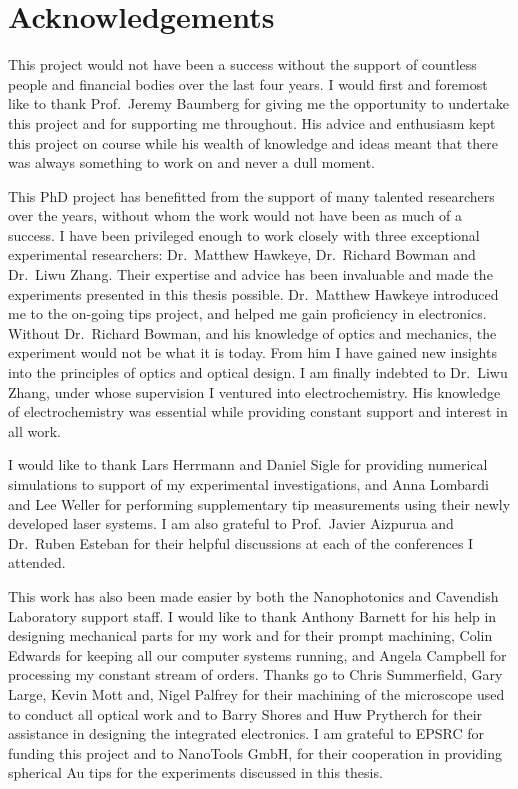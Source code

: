 \documentclass[12pt, a4paper, oneside]{book}
\begin{document}
\newpage
\section*{Acknowledgements}

This project would not have been a success without the support of countless people and financial bodies over the last four years.
I would first and foremost like to thank Prof.\ Jeremy Baumberg for giving me the opportunity to undertake this project and for supporting me throughout. His advice and enthusiasm kept this project on course while his wealth of knowledge and ideas meant that there was always something to work on and never a dull moment.

This PhD project has benefitted from the support of many talented researchers over the years, without whom the work would not have been as much of a success. I have been privileged enough to work closely with three exceptional experimental researchers: Dr.\ Matthew Hawkeye, Dr.\ Richard Bowman and Dr.\ Liwu Zhang. Their expertise and advice has been invaluable and made the experiments presented in this thesis possible. Dr.\ Matthew Hawkeye introduced me to the on-going tips project, and helped me gain proficiency in electronics. Without Dr.\ Richard Bowman, and his knowledge of optics and mechanics, the experiment would not be what it is today. From him I have gained new insights into the principles of optics and optical design. I am finally indebted to Dr.\ Liwu Zhang, under whose supervision I ventured into electrochemistry. His knowledge of electrochemistry was essential while providing constant support and interest in all work.

I would like to thank Lars Herrmann and Daniel Sigle for providing numerical simulations to support of my experimental investigations, and Anna Lombardi and Lee Weller for performing supplementary tip measurements using their newly developed laser systems. I am also grateful to Prof.\ Javier Aizpurua and Dr.\ Ruben Esteban for their helpful discussions at each of the conferences I attended.

This work has also been made easier by both the Nanophotonics and Cavendish Laboratory support staff. I would like to thank Anthony Barnett for his help in designing mechanical parts for my work and for their prompt machining, Colin Edwards for keeping all our computer systems running, and Angela Campbell for processing my constant stream of orders. Thanks go to Chris Summerfield, Gary Large, Kevin Mott and, Nigel Palfrey for their machining of the microscope used to conduct all optical work and to Barry Shores and Huw Prytherch for their assistance in designing the integrated electronics. I am grateful to EPSRC for funding this project and to NanoTools GmbH, for their cooperation in providing spherical Au tips for the experiments discussed in this thesis.
\end{document}

